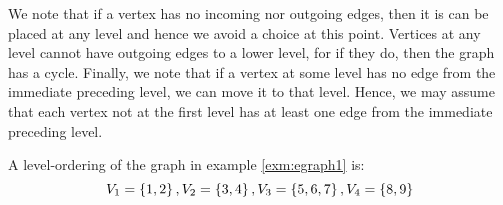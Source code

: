 \documentclass[./Thick_TQFTs_and_Quantum_Information.tex]{subfiles}
\begin{document}
\begin{rmk}\label{rmk:lgraph_edge}
We note that if a vertex has no incoming nor outgoing edges, then it is can be
placed at any level and hence we avoid a choice at this point. Vertices at any
level cannot have outgoing edges to a lower level, for if they do, then the
graph has a cycle. Finally, we note that if a vertex at some level has no edge
from the immediate preceding level, we can move it to that level. Hence, we may
assume that each vertex not at the first level has at least one edge from the
immediate preceding level.
\end{rmk}

\begin{exm}
A level-ordering of the graph in example \ref{exm:egraph1} is:
\[
  V_1 = \set{1, 2}, V_2 = \set{3, 4}, V_3 = \set{5, 6, 7}, V_4 = \set{8, 9}
\]
\end{exm}
\end{document}
